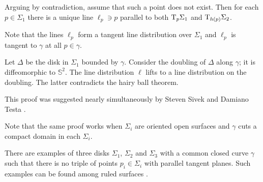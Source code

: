 \medskip

Arguing by contradiction,
assume that such a point does not exist.
Then for each $p\in\Sigma_1$
there is a unique line $\ell_p\ni p$ 
 parallel to both $\mathrm{T}_{p} \Sigma_1$ and $\mathrm{T}_{h(p)} \Sigma_2$.

Note that the lines $\ell_p$ form a tangent line distribution over $\Sigma_1$
and $\ell_p$ is tangent to $\gamma$ at all $p\in\gamma$.

Let $\Delta$ be the disk in $\Sigma_1$ bounded by $\gamma$.
Consider the doubling of $\Delta$ along  $\gamma$;
it is diffeomorphic to $\mathbb S^2$.
The line distribution $\ell$ lifts to a line distribution on the doubling.
The latter contradicts the hairy ball theorem.\qeds


This proof was suggested nearly simultaneously 
by Steven Sivek 
and Damiano Testa \cite{two-disks}.

Note that the same proof works when $\Sigma_i$ are oriented open surfaces and $\gamma$ cuts a compact domain in each $\Sigma_i$.

There are examples of three disks $\Sigma_1$, $\Sigma_2$ and $\Sigma_3$
with a common closed curve $\gamma$ such that there is
no triple of points $p_i\in\Sigma_i$ with parallel tangent planes.
Such examples can be found among ruled surfaces \cite{three-disks}.
